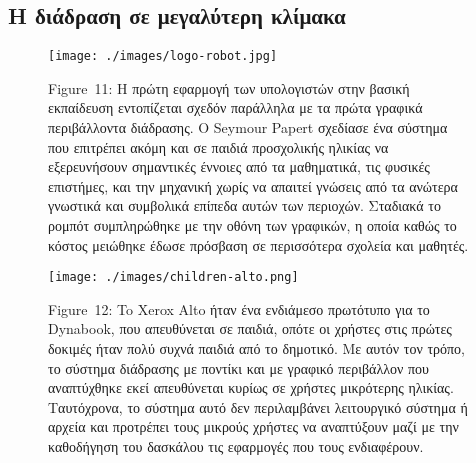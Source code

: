 \documentclass[
]{article}
\begin{document}
\hypertarget{ux3b7-ux3b4ux3b9ux3acux3b4ux3c1ux3b1ux3c3ux3b7-ux3c3ux3b5-ux3bcux3b5ux3b3ux3b1ux3bbux3cdux3c4ux3b5ux3c1ux3b7-ux3baux3bbux3afux3bcux3b1ux3baux3b1}{%
\subsection{Η διάδραση σε μεγαλύτερη
κλίμακα}\label{ux3b7-ux3b4ux3b9ux3acux3b4ux3c1ux3b1ux3c3ux3b7-ux3c3ux3b5-ux3bcux3b5ux3b3ux3b1ux3bbux3cdux3c4ux3b5ux3c1ux3b7-ux3baux3bbux3afux3bcux3b1ux3baux3b1}}

\leavevmode{}%
\begin{figure}
\hypertarget{fig:logo-robot}{%
\centering
\texttt{[image: ./images/logo-robot.jpg]}
\caption{Figure~11: Η πρώτη εφαρμογή των υπολογιστών στην βασική
εκπαίδευση εντοπίζεται σχεδόν παράλληλα με τα πρώτα γραφικά περιβάλλοντα
διάδρασης. Ο Seymour Papert σχεδίασε ένα σύστημα που επιτρέπει ακόμη και
σε παιδιά προσχολικής ηλικίας να εξερευνήσουν σημαντικές έννοιες από τα
μαθηματικά, τις φυσικές επιστήμες, και την μηχανική χωρίς να απαιτεί
γνώσεις από τα ανώτερα γνωστικά και συμβολικά επίπεδα αυτών των
περιοχών. Σταδιακά το ρομπότ συμπληρώθηκε με την οθόνη των γραφικών, η
οποία καθώς το κόστος μειώθηκε έδωσε πρόσβαση σε περισσότερα σχολεία και
μαθητές.}\label{fig:logo-robot}
}
\end{figure}

\leavevmode{}%
\begin{figure}
\hypertarget{fig:children-alto}{%
\centering
\texttt{[image: ./images/children-alto.png]}
\caption{Figure~12: To Xerox Alto ήταν ένα ενδιάμεσο πρωτότυπο για το
Dynabook, που απευθύνεται σε παιδιά, οπότε οι χρήστες στις πρώτες
δοκιμές ήταν πολύ συχνά παιδιά από το δημοτικό. Με αυτόν τον τρόπο, το
σύστημα διάδρασης με ποντίκι και με γραφικό περιβάλλον που αναπτύχθηκε
εκεί απευθύνεται κυρίως σε χρήστες μικρότερης ηλικίας. Ταυτόχρονα, το
σύστημα αυτό δεν περιλαμβάνει λειτουργικό σύστημα ή αρχεία και προτρέπει
τους μικρούς χρήστες να αναπτύξουν μαζί με την καθοδήγηση του δασκάλου
τις εφαρμογές που τους ενδιαφέρουν.}\label{fig:children-alto}
}
\end{figure}
\end{document}

